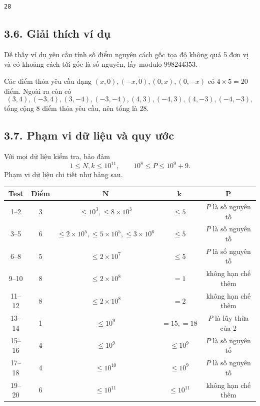 \documentclass[11pt]{article}
\begin{document}
\begin{verbatim}
28
\end{verbatim}

\subsection*{3.6. Giải thích ví dụ}

Dễ thấy ví dụ yêu cầu tính số điểm nguyên cách gốc tọa độ không quá 5 đơn vị
và có khoảng cách tới gốc là số nguyên, lấy modulo \(998244353\).

Các điểm thỏa yêu cầu dạng \((x,0),(-x,0),(0,x),(0,-x)\) có
\(4\times5=20\) điểm. Ngoài ra còn có
\[
  (3,4),(-3,4),(3,-4),(-3,-4),(4,3),(-4,3),(4,-3),(-4,-3),
\]
tổng cộng 8 điểm thỏa yêu cầu, nên tổng là 28.

\subsection*{3.7. Phạm vi dữ liệu và quy ước}

Với mọi dữ liệu kiểm tra, bảo đảm
\[
  1\le N,k\le10^{11},\qquad 10^8\le P\le10^9+9.
\]
Phạm vi dữ liệu chi tiết như bảng sau.

\begin{center}
\small
\begin{tabular}{c c c c c}
\textbf{Test} & \textbf{Điểm} & \(\boldsymbol N\) & \(\boldsymbol k\) &
\(\boldsymbol P\) \\
\hline
1--2 & 3 & \(\le10^3,\le8\times10^3\) & \(\le5\) & \(P\) là số nguyên tố \\
3--5 & 6 & \(\le2\times10^5,\le5\times10^5,\le3\times10^6\) & \(\le5\) &
\(P\) là số nguyên tố \\
6--8 & 5 & \(\le2\times10^7\) & \(\le5\) & \(P\) là số nguyên tố \\
9--10 & 8 & \(\le2\times10^8\) & \(=1\) & không hạn chế thêm \\
11--12 & 8 & \(\le2\times10^8\) & \(=2\) & không hạn chế thêm \\
13--14 & 1 & \(\le10^9\) & \(=15,=18\) & \(P\) là lũy thừa của 2 \\
15--16 & 4 & \(\le10^9\) & \(\le10^9\) & \(P\) là số nguyên tố \\
17--18 & 4 & \(\le10^{10}\) & \(\le10^9\) & \(P\) là số nguyên tố \\
19--20 & 6 & \(\le10^{11}\) & \(\le10^{11}\) & không hạn chế thêm
\end{tabular}
\end{center}
\end{document}
